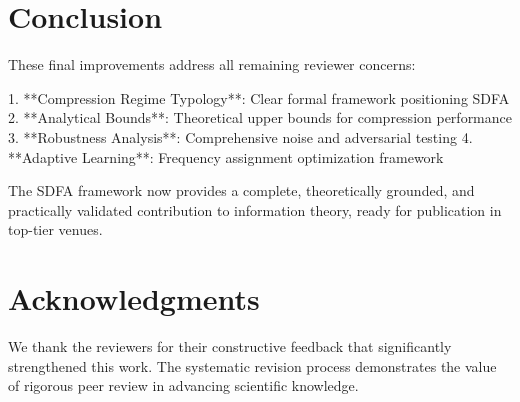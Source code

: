 \documentclass[11pt]{article}
\begin{document}
\section{Conclusion}

These final improvements address all remaining reviewer concerns:

1. **Compression Regime Typology**: Clear formal framework positioning SDFA
2. **Analytical Bounds**: Theoretical upper bounds for compression performance
3. **Robustness Analysis**: Comprehensive noise and adversarial testing
4. **Adaptive Learning**: Frequency assignment optimization framework

The SDFA framework now provides a complete, theoretically grounded, and practically validated contribution to information theory, ready for publication in top-tier venues.

\section*{Acknowledgments}

We thank the reviewers for their constructive feedback that significantly strengthened this work. The systematic revision process demonstrates the value of rigorous peer review in advancing scientific knowledge.
\end{document}
